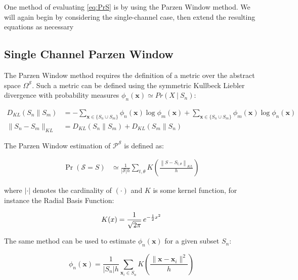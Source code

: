 \documentclass[10pt]{article}
\begin{document}
One method of evaluating \ref{eq:PrS} is by using the Parzen Window method.  We will again begin by considering the single-channel case, then extend the resulting equations as necessary

\subsection{ Single Channel Parzen Window}

The Parzen Window method requires the definition of a metric over the abstract space \( \Omega^\mathcal{S} \).  Such a metric can be defined using the symmetric Kullbeck Liebler divergence with probability measures \( \phi_n(\mathbf{x}) \simeq Pr(X \ | \ S_n) \):

\begin{align} \label{eq:KLsingle}
D_{KL}(S_n\|S_m) &= -\sum_{\mathbf{x} \in \{ S_n \cup S_m \} } \phi_n(\mathbf{x}) \log \phi_m(\mathbf{x}) + \sum_{\mathbf{x} \in \{ S_n \cup S_m \} } \phi_m(\mathbf{x}) \log \phi_n(\mathbf{x}) \\
\|S_n - S_m\|_{KL} &= D_{KL}(S_n\|S_m) + D_{KL}(S_m\|S_n)
\end{align}

The Parzen Window estimation of \( \mathcal{P}^\mathcal{S} \) is defined as:

\begin{align} \label{eq:PrSParzenSingle}
\Pr( \mathcal{S} = S ) &\simeq \frac{1}{|\mathcal{S}| h} \sum_{t,\theta} K \left( \frac{ \left\| S - S_{t,\theta} \right\|_{KL} } { h } \right)
\end{align}

where \( | \cdot | \) denotes the cardinality of \( ( \cdot ) \) and \( K \) is some kernel function, for instance the Radial Basis Function:

\begin{equation} \label{eq:RBFparzen}
K(x) = {1 \over \sqrt{2\pi} }\,e^{-\frac{1}{2}x^2}
\end{equation}

The same method can be used to estimate \( \phi_n(\mathbf{x}) \) for a given subset \( S_n \):

\begin{equation} \label{eq:PhiSingle}
\phi_n( \mathbf{x} ) = \frac{1}{|S_n| h} \sum_{\mathbf{x}_i \in S_n} K \left( \frac{ \| \mathbf{x} - \mathbf{x}_i \|^2 }{ h} \right)
\end{equation}
\end{document}
